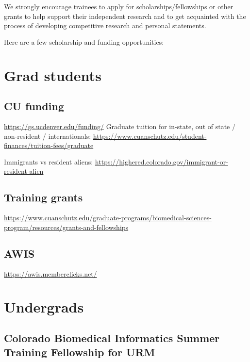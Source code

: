 \documentclass[
  letterpaper,
  DIV=11,
  numbers=noendperiod]{scrreprt}
\begin{document}
We strongly encourage trainees to apply for scholarships/fellowships or
other grants to help support their independent research and to get
acquainted with the process of developing competitive research and
personal statements.

Here are a few scholarship and funding opportunities:

\hypertarget{grad-students}{%
\section{Grad students}\label{grad-students}}

\hypertarget{cu-funding}{%
\subsection{CU funding}\label{cu-funding}}

\url{https://gs.ucdenver.edu/funding/} Graduate tuition for in-state,
out of state / non-resident / internationals:
\url{https://www.cuanschutz.edu/student-finances/tuition-fees/graduate}

Immigrants vs resident aliens:
\url{https://highered.colorado.gov/immigrant-or-resident-alien}

\hypertarget{training-grants}{%
\subsection{Training grants}\label{training-grants}}

\url{https://www.cuanschutz.edu/graduate-programs/biomedical-sciences-program/resources/grants-and-fellowships}

\hypertarget{awis}{%
\subsection{AWIS}\label{awis}}

\url{https://awis.memberclicks.net/}

\hypertarget{undergrads}{%
\section{Undergrads}\label{undergrads}}

\hypertarget{colorado-biomedical-informatics-summer-training-fellowship-for-urm}{%
\subsection{Colorado Biomedical Informatics Summer Training Fellowship
for
URM}\label{colorado-biomedical-informatics-summer-training-fellowship-for-urm}}
\end{document}
